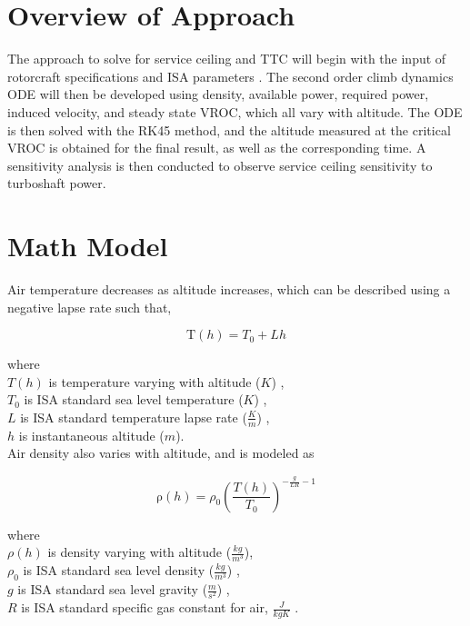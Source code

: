 \documentclass[12pt]{report}
\begin{document}
\section{Overview of Approach}
The approach to solve for service ceiling and TTC will begin with the input of rotorcraft specifications and ISA parameters \cite{ISA}.
The second order climb dynamics ODE will then be developed using density, available power, required power, induced velocity,
and steady state VROC, which all vary with altitude. The ODE is then solved with the RK45 method, and the altitude measured at the
critical VROC is obtained for the final result, as well as the corresponding time. A sensitivity analysis is then conducted
to observe service ceiling sensitivity to turboshaft power.

\section{Math Model}

Air temperature decreases as altitude increases, which can be described using a negative lapse rate such that,

\begin{equation} \label{eq:temp}
    \mathrm T(h)=T_0+Lh
\end{equation}

\noindent where\\
    \indent $T(h)$ is temperature varying with altitude ($K$) \cite{helidyn},\\
    \indent $T_0$ is ISA standard sea level temperature ($K$) \cite{ISA},\\
    \indent $L$ is ISA standard temperature lapse rate ($\frac{K}{m}$) \cite{ISA},\\
    \indent $h$ is instantaneous altitude ($m$).\\

\noindent Air density also varies with altitude, and is modeled as

\begin{equation} \label{eq:density}
    \mathrm \rho(h)=\rho_0(\frac{T(h)}{T_0})^{-\frac{g}{LR}-1}
\end{equation}

\noindent where\\
    \indent $\rho(h)$ is density varying with altitude ($\frac{kg}{m^3}$),\\
    \indent $\rho_0$ is ISA standard sea level density ($\frac{kg}{m^3}$) \cite{ISA},\\
    \indent $g$ is ISA standard sea level gravity ($\frac{m}{s^2}$) \cite{ISA},\\
    \indent $R$ is ISA standard specific gas constant for air, $\frac{J}{kgK}$ \cite{ISA}.\\
\end{document}
